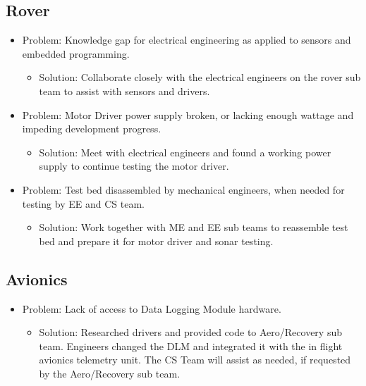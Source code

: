 \documentclass[onecolumn, draftclsnofoot,10pt, compsoc]{IEEEtran}
\begin{document}
\subsection{Rover}

\begin{itemize}
\item Problem: Knowledge gap for electrical engineering as applied to sensors and embedded programming.
\begin{itemize}
\item Solution: Collaborate closely with the electrical engineers on the rover sub team to assist with sensors and drivers.
\end{itemize}
\item Problem: Motor Driver power supply broken, or lacking enough wattage and impeding development progress.
\begin{itemize}
\item Solution: Meet with electrical engineers and found a working power supply to continue testing the motor driver.
\end{itemize}
\item Problem: Test bed disassembled by mechanical engineers, when needed for testing by EE and CS team.
\begin{itemize}
\item Solution: Work together with ME and EE sub teams to reassemble test bed and prepare it for motor driver and sonar testing.
\end{itemize}
\end{itemize}
\subsection{Avionics}
\begin{itemize}
\item Problem: Lack of access to Data Logging Module hardware.
\begin{itemize}
\item Solution: Researched drivers and provided code to Aero/Recovery sub team. Engineers changed the DLM and integrated it with the in flight avionics telemetry unit. The CS Team will assist as needed, if requested by the Aero/Recovery sub team.
\end{itemize}
\end{itemize}
\end{document}

